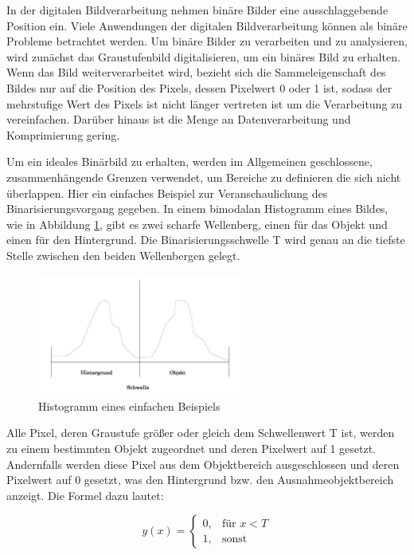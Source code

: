 In der digitalen Bildverarbeitung nehmen binäre Bilder eine ausschlaggebende Position ein. Viele Anwendungen der digitalen Bildverarbeitung können als binäre Probleme betrachtet werden. Um binäre Bilder zu verarbeiten und zu analysieren, wird zunächst das Graustufenbild digitalisieren, um ein binäres Bild zu erhalten. Wenn das Bild weiterverarbeitet wird, bezieht sich die Sammeleigenschaft des Bildes nur auf die Position des Pixels, dessen Pixelwert 0 oder 1 ist, sodass der mehrstufige Wert des Pixels ist nicht länger vertreten ist um die Verarbeitung zu vereinfachen. Darüber hinaus ist die Menge an Datenverarbeitung und Komprimierung gering. 

Um ein ideales Binärbild zu erhalten, werden im Allgemeinen geschlossene, zusammenhängende Grenzen verwendet, um Bereiche zu definieren die sich nicht überlappen. Hier ein einfaches Beispiel zur Veranschaulichung des Binarisierungsvorgang gegeben. In einem bimodalan Histogramm eines Bildes, wie in Abbildung \ref{fig:Histogramm eines einfachen Beispiels}, gibt es zwei scharfe Wellenberg, einen für das Objekt und einen für den Hintergrund. Die Binarisierungsschwelle T wird genau an die tiefste Stelle zwischen den beiden Wellenbergen gelegt. 

\begin{figure}[htb]
 \centering 
  \includegraphics[keepaspectratio,width=0.6\textwidth]{images/4_ZweiteErfahrung/Binar/binar.pdf}
 \caption{Histogramm eines einfachen Beispiels}
 \label{fig:Histogramm eines einfachen Beispiels}
\end{figure} 

Alle Pixel, deren Graustufe größer oder gleich dem Schwellenwert T ist, werden zu einem bestimmten Objekt zugeordnet und deren Pixelwert auf 1 gesetzt. Andernfalls werden diese Pixel aus dem Objektbereich ausgeschlossen und deren Pixelwert auf 0 gesetzt, was den Hintergrund bzw. den Ausnahmeobjektbereich anzeigt. Die Formel dazu lautet:

\begin{equation}
  y(x) =
  \begin{cases} 
  0,   & \mbox{für }x < T \\
  1, & \mbox{sonst}
  \end{cases}
\end{equation}

